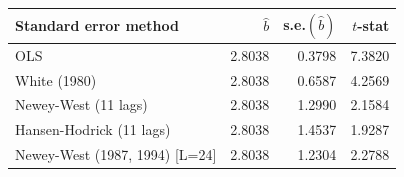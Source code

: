 \begin{tabular}{lrrr}
\hline
Standard error method & $\hat{b}$ & s.e.$(\hat{b})$ & $t$-stat \\
\hline
OLS & 2.8038 & 0.3798 & 7.3820 \\
White (1980) & 2.8038 & 0.6587 & 4.2569 \\
Newey-West (11 lags) & 2.8038 & 1.2990 & 2.1584 \\
Hansen-Hodrick (11 lags) & 2.8038 & 1.4537 & 1.9287 \\
Newey-West (1987, 1994) [L=24] & 2.8038 & 1.2304 & 2.2788 \\
\hline
\end{tabular}
